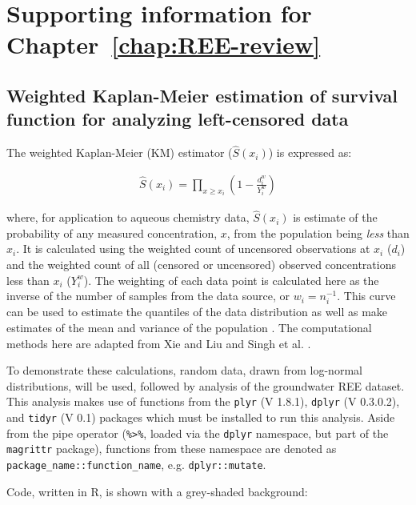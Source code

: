 \chapter{Supporting information for Chapter~\ref{chap:REE-review}}\label{app:REE-review}

\section{Weighted Kaplan-Meier estimation of survival function for analyzing left-censored data}

The weighted Kaplan-Meier (KM) estimator (\(\widehat{S}(x_i)\)) is expressed as:

\begin{align*}
\widehat{S}(x_i) = \prod_{x \geq x_i}\left(1 - \frac{d_i^w}{Y_i^w}\right)
\end{align*}

where, for application to aqueous chemistry data, \(\widehat{S}(x_i)\) is estimate of the probability of any measured concentration, \(x\), from the population being \emph{less} than \(x_i\).
It is calculated using the weighted count of uncensored observations at \(x_i\) (\(d_i\)) and the weighted count of all (censored or uncensored) observed concentrations less than \(x_i\) (\(Y_i^w\)).
The weighting of each data point is calculated here as the inverse of the number of samples from the data source, or \(w_i = n_i^{-1}\).
This curve can be used to estimate the quantiles of the data distribution as well as make estimates of the mean and variance of the population \citep{Helsel_book}.
The computational methods here are adapted from Xie and Liu \citep{Xie_SiM_2005} and Singh et al. \citep{Singh_JAWMA_2013}.

To demonstrate these calculations, random data, drawn from log-normal distributions, will be used, followed by analysis of the groundwater REE dataset.
This analysis makes use of functions from the \texttt{plyr} (V 1.8.1), \texttt{dplyr} (V 0.3.0.2), and \texttt{tidyr} (V 0.1) packages which must be installed to run this analysis.
Aside from the pipe operator (\texttt{\%\textgreater{}\%}, loaded via the \texttt{dplyr} namespace, but part of the \texttt{magrittr} package), functions from these namespace are denoted as \texttt{package\_name::function\_name}, e.g. \texttt{dplyr::mutate}. 

Code, written in R, is shown with a grey-shaded background:

